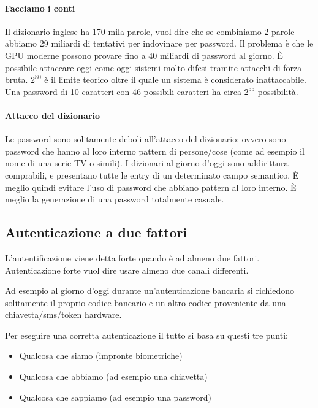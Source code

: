 \paragraph*{Facciamo i conti}

Il dizionario inglese ha 170 mila parole, vuol dire che se combiniamo 2 parole
abbiamo 29 miliardi di tentativi per indovinare per password. Il problema è che
le GPU moderne possono provare fino a 40 miliardi di password al giorno.
È possibile attaccare oggi come oggi sistemi molto difesi tramite attacchi di
forza bruta.
$2^{80}$ è il limite teorico oltre il quale un sistema è considerato
inattaccabile. Una password di 10 caratteri con 46 possibili caratteri ha circa
$2^{55}$ possibilità.

\paragraph*{Attacco del dizionario}
Le password sono solitamente deboli all'attacco del dizionario: ovvero sono
password che hanno al loro interno pattern di persone/cose (come ad esempio il
nome di una serie TV o simili). I dizionari al giorno d'oggi sono addirittura
comprabili, e presentano tutte le entry di un determinato campo semantico.
È meglio quindi evitare l'uso di password che abbiano pattern al loro interno.
È meglio la generazione di una password totalmente casuale.

\subsection{Autenticazione a due fattori}

L'autentificazione viene detta forte quando è ad almeno due fattori.
Autenticazione forte vuol dire usare almeno due canali differenti.

Ad esempio al giorno d'oggi durante un'autenticazione bancaria si richiedono
solitamente il proprio codice bancario e un altro codice proveniente da una
chiavetta/sms/token hardware.

Per eseguire una corretta autenticazione il tutto si basa su questi tre punti:
\begin{itemize}
 \item Qualcosa che siamo (impronte biometriche)
 \item Qualcosa che abbiamo (ad esempio una chiavetta)
 \item Qualcosa che sappiamo (ad esempio una password)
\end{itemize}

